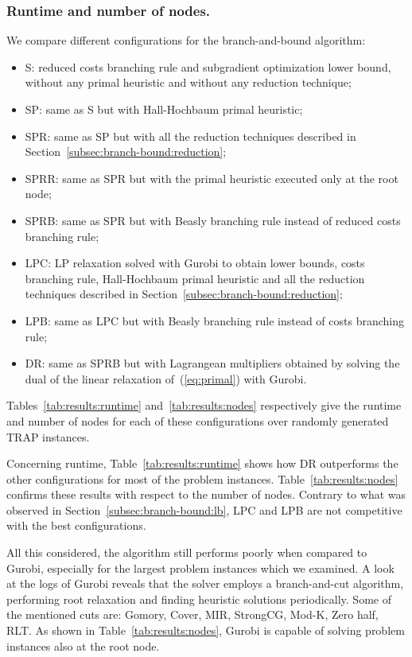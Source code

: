 \documentclass[runningheads]{llncs}
\begin{document}
\subsubsection{Runtime and number of nodes.} We compare different configurations for the branch-and-bound algorithm:
\begin{itemize}
  \item S: reduced costs branching rule and subgradient optimization lower bound, without any primal heuristic and without any reduction technique;
  \item SP: same as S but with Hall-Hochbaum primal heuristic;
  \item SPR: same as SP but with all the reduction techniques described in Section~\ref{subsec:branch-bound:reduction};
  \item SPRR: same as SPR but with the primal heuristic executed only at the root node;
  \item SPRB: same as SPR but with Beasly branching rule instead of reduced costs branching rule;
  \item LPC: LP relaxation solved with Gurobi to obtain lower bounds, costs branching rule, Hall-Hochbaum primal heuristic and all the reduction techniques described in Section~\ref{subsec:branch-bound:reduction};
  \item LPB: same as LPC but with Beasly branching rule instead of costs branching rule;
  \item DR: same as SPRB but with Lagrangean multipliers obtained by solving the dual of the linear relaxation of~(\ref{eq:primal}) with Gurobi.
\end{itemize}

Tables~\ref{tab:results:runtime} and~\ref{tab:results:nodes} respectively give the runtime and number of nodes for each of these configurations over randomly generated TRAP instances. 


Concerning runtime, Table~\ref{tab:results:runtime} shows how DR outperforms the other configurations for most of the problem instances. Table~\ref{tab:results:nodes} confirms these results with respect to the number of nodes. Contrary to what was observed in Section~\ref{subsec:branch-bound:lb}, LPC and LPB are not competitive with the best configurations. 

All this considered, the algorithm still performs poorly when compared to Gurobi, especially for the largest problem instances which we examined. A look at the logs of Gurobi reveals that the solver employs a branch-and-cut algorithm, performing root relaxation and finding heuristic solutions periodically. Some of the mentioned cuts are: Gomory, Cover, MIR, StrongCG, Mod-K, Zero half, RLT. As shown in Table~\ref{tab:results:nodes}, Gurobi is capable of solving problem instances also at the root node. 
\end{document}
